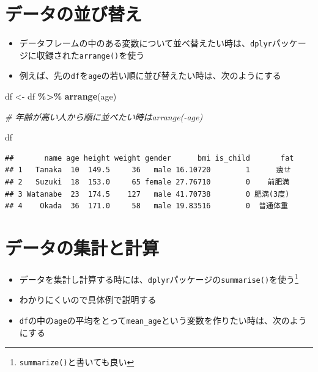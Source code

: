 \documentclass[
]{book}
\newenvironment{Shaded}{\begin{snugshade}}{\end{snugshade}}
\newcommand{\CommentTok}[1]{\textcolor[rgb]{0.56,0.35,0.01}{\textit{#1}}}
\newcommand{\FunctionTok}[1]{\textcolor[rgb]{0.13,0.29,0.53}{\textbf{#1}}}
\newcommand{\NormalTok}[1]{#1}
\newcommand{\OtherTok}[1]{\textcolor[rgb]{0.56,0.35,0.01}{#1}}
\newcommand{\SpecialCharTok}[1]{\textcolor[rgb]{0.81,0.36,0.00}{\textbf{#1}}}
\providecommand{\tightlist}{%
  \setlength{\itemsep}{0pt}\setlength{\parskip}{0pt}}
\begin{document}
\hypertarget{ux30c7ux30fcux30bfux306eux4e26ux3073ux66ffux3048}{%
\section{データの並び替え}\label{ux30c7ux30fcux30bfux306eux4e26ux3073ux66ffux3048}}

\begin{itemize}
\tightlist
\item
  データフレームの中のある変数について並べ替えたい時は、\texttt{dplyr}パッケージに収録された\texttt{arrange()}を使う
\item
  例えば、先の\texttt{df}を\texttt{age}の若い順に並び替えたい時は、次のようにする
\end{itemize}

\begin{Shaded}
\begin{Highlighting}[]
\NormalTok{df }\OtherTok{\textless{}{-}}\NormalTok{ df }\SpecialCharTok{\%\textgreater{}\%} \FunctionTok{arrange}\NormalTok{(age)}

\CommentTok{\# 年齢が高い人から順に並べたい時はarrange({-}age)}

\NormalTok{df}
\end{Highlighting}
\end{Shaded}

\begin{verbatim}
##       name age height weight gender      bmi is_child       fat
## 1   Tanaka  10  149.5     36   male 16.10720        1      痩せ
## 2   Suzuki  18  153.0     65 female 27.76710        0    前肥満
## 3 Watanabe  23  174.5    127   male 41.70738        0 肥満(3度)
## 4    Okada  36  171.0     58   male 19.83516        0  普通体重
\end{verbatim}

\hypertarget{ux30c7ux30fcux30bfux306eux96c6ux8a08ux3068ux8a08ux7b97}{%
\section{データの集計と計算}\label{ux30c7ux30fcux30bfux306eux96c6ux8a08ux3068ux8a08ux7b97}}

\begin{itemize}
\tightlist
\item
  データを集計し計算する時には、\texttt{dplyr}パッケージの\texttt{summarise()}を使う\footnote{\texttt{summarize()}と書いても良い}
\item
  わかりにくいので具体例で説明する
\item
  \texttt{df}の中の\texttt{age}の平均をとって\texttt{mean\_age}という変数を作りたい時は、次のようにする
\end{itemize}
\end{document}
